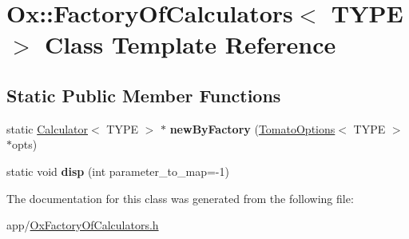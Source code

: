\hypertarget{class_ox_1_1_factory_of_calculators}{\section{Ox\-:\-:Factory\-Of\-Calculators$<$ T\-Y\-P\-E $>$ Class Template Reference}
\label{class_ox_1_1_factory_of_calculators}
}
\subsection*{Static Public Member Functions}
\begin{DoxyCompactItemize}
\item 
\hypertarget{class_ox_1_1_factory_of_calculators_a0224bacd25fb4b9d706d0f9c6321ba34}{static \hyperlink{class_ox_1_1_calculator}{Calculator}$<$ T\-Y\-P\-E $>$ $\ast$ {\bfseries new\-By\-Factory} (\hyperlink{struct_ox_1_1_tomato_options}{Tomato\-Options}$<$ T\-Y\-P\-E $>$ $\ast$opts)}\label{class_ox_1_1_factory_of_calculators_a0224bacd25fb4b9d706d0f9c6321ba34}

\item 
\hypertarget{class_ox_1_1_factory_of_calculators_a25117329e54b745cf545a4fb5541fed0}{static void {\bfseries disp} (int parameter\-\_\-to\-\_\-map=-\/1)}\label{class_ox_1_1_factory_of_calculators_a25117329e54b745cf545a4fb5541fed0}

\end{DoxyCompactItemize}


The documentation for this class was generated from the following file\-:\begin{DoxyCompactItemize}
\item 
app/\hyperlink{_ox_factory_of_calculators_8h}{Ox\-Factory\-Of\-Calculators.\-h}\end{DoxyCompactItemize}
